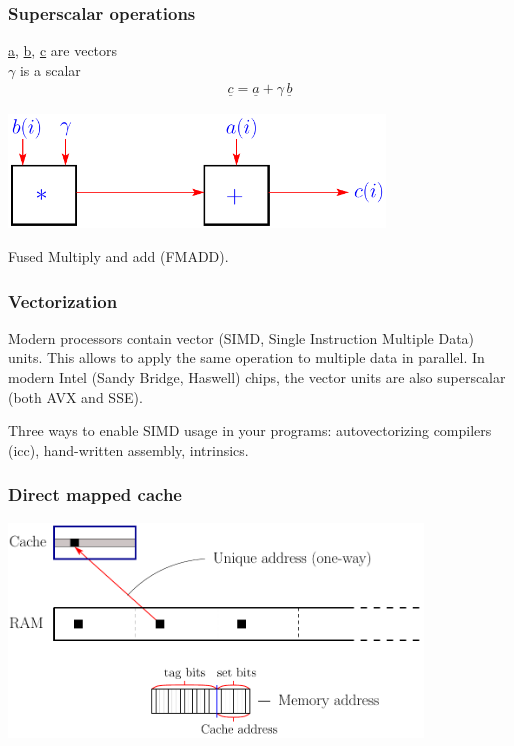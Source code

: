 \documentclass{beamer}
\begin{document}
\begin{frame}\frametitle{Superscalar operations}
\underline{a}, \underline{b}, \underline{c} are vectors\\
$\gamma$ is a scalar
\begin{align*}
 \underline{c} = \underline{a} + \gamma\, \underline{b} 
 \end{align*}
 \vspace{0.5cm}

\begin{center}
  \includegraphics[width=10cm]{../../notes/01.single/SuperScalar}
\end{center}
 \vspace{0.5cm}

\begin{center}
  Fused Multiply and add (FMADD).
\end{center}
\end{frame}

\begin{frame}\frametitle{Vectorization}
Modern processors contain vector (SIMD, Single Instruction Multiple Data) units.
This allows to apply the same operation to multiple data in parallel. In
modern Intel (Sandy Bridge, Haswell) chips, the vector units are also
superscalar (both AVX and SSE).


Three ways to enable SIMD usage in your programs:
autovectorizing compilers (icc), hand-written assembly, intrinsics.
\end{frame}

\begin{frame}\frametitle{Direct mapped cache}
\begin{center}
  \includegraphics[width=11cm]{../../notes/01.single/DirectMappedCache}
\end{center}
\end{frame}
\end{document}
